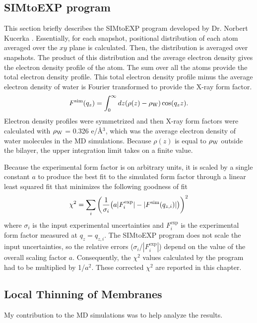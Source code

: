 \subsection{SIMtoEXP program}\label{sec:SIMtoEXP}
This section briefly describes the SIMtoEXP program
developed by Dr. Norbert Kucerka \cite{Kucerka10}.
Essentially, for each snapshot, positional distribution of each atom
averaged over the $xy$ plane is calculated. Then, the distribution is
averaged over snapshots. The product of this distribution and the average
electron density gives the electron density profile of the atom. The sum 
over all the atoms provide the total electron density profile. This total
electron density profile minus the average electron density of water
is Fourier transformed to provide the X-ray form factor.
\begin{equation}
  F^\textrm{sim}(q_z) = \int_0^\infty\mathop{dz} (\rho(z)-\rho_\textrm{W})\cos (q_zz).
\end{equation}
Electron density profiles were symmetrized and then
X-ray form factors were calculated with $\rho_\textrm{W}$ = 0.326 e/\AA$^3$,
which was the average electron density of water molecules in the MD simulations.
Because $\rho(z)$ is equal to $\rho_\textrm{W}$ outside the bilayer, the upper 
integration limit takes on a finite value. 

Because the experimental form factor is on arbitrary units, it is 
scaled by a single constant $a$ to produce the best fit to the simulated
form factor through a linear least squared fit that minimizes the 
following goodness of fit
\begin{equation}
  \chi^2 = \sum_i \left(\frac{1}{\sigma_i}\mathopen{}\left( 
    a|F^\textrm{exp}_i| - |F^\textrm{sim}(q_{z,i})|
   \right)\mathclose{}\right)^2
\end{equation}
where $\sigma_i$ is the input experimental uncertainties and $F_i^\textrm{exp}$
is the experimental form factor measured at $q_z = q_{z,i}$.
The SIMtoEXP program does not scale the input uncertainties, so
the relative errors ($\sigma_i$/$|F_i^\textrm{exp}|$) depend on the value of
the overall scaling factor $a$. Consequently, the $\chi^2$ values calculated by 
the program had to be multiplied by 1/$a^2$. 
These corrected $\chi^2$ are reported in this chapter.

\subsection{Local Thinning of Membranes}\label{sec:local_thinning}
My contribution to the MD simulations was to help analyze the results.

